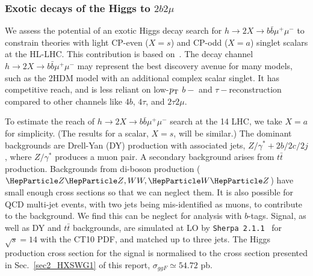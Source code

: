 \subsubsection[Y.M. Zhong]{Exotic  decays of the Higgs to $2b2\mu$}\label{Sec:2b2muExo}
We assess the potential of an exotic Higgs decay search for $h \to 2X \to b\bar{b}\mu^+ \mu^-$ to constrain theories with light CP-even ($X = s$) and CP-odd ($X = a$) singlet scalars at the HL-LHC. This contribution is based on~\cite{Curtin:2014pda}. The decay channel $h \to 2X \to b\bar{b}\mu^+ \mu^-$ may represent the best discovery avenue for many models, such as the 2HDM model with an additional complex scalar singlet. It has competitive reach, and is less reliant on low-$p_{\rm T}$ $b-$ and $\tau-$reconstruction compared to other channels like $4b$, $4\tau$, and $2\tau2\mu$. 


To estimate the reach of $h \to 2X \to b\bar{b}\mu^+ \mu^-$ search at the 14 \UTeV LHC, we take $X =a$ for simplicity. (The results for a scalar, $X=s$, will be similar.) The dominant backgrounds are Drell-Yan (DY) production with associated jets, \ie $Z/\gamma^*+2b/2c/2j$, where $Z/\gamma^*$ produces a muon pair. A secondary background arises from $t\bar t$ production. Backgrounds from di-boson production ($\PZ\PZ, WW, \PW\PZ$) have small enough cross sections so that we can neglect them. It is also possible for QCD multi-jet events, with two jets being mis-identified as muons, to contribute to the background. We find this can be neglect for analysis with $b$-tags. Signal, as well as DY and $t\bar t$ backgrounds, are simulated at LO by \texttt{Sherpa 2.1.1}~\cite{Gleisberg:2008ta} for $\sqrt{s}=14$ \UTeV with the CT10 PDF, and matched up to three jets. The Higgs production cross section for the signal is normalised to the cross section presented in Sec.~\ref{sec2_HXSWG1} of this report, $\sigma_{ggF} \simeq 54.72$ pb.  



